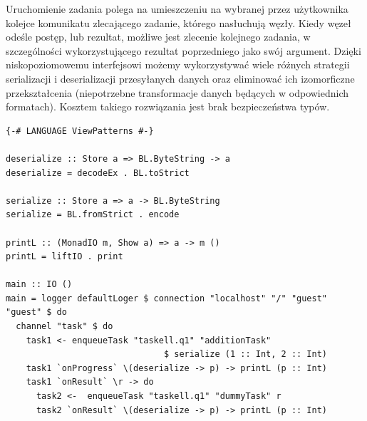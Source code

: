 Uruchomienie zadania polega na umieszczeniu na wybranej przez użytkownika kolejce komunikatu zlecającego zadanie, którego nasłuchują węzły. Kiedy węzeł odeśle postęp, lub rezultat, możliwe jest zlecenie kolejnego zadania, w szczególności wykorzystującego rezultat poprzedniego jako swój argument. Dzięki niskopoziomowemu interfejsowi możemy wykorzystywać wiele różnych strategii serializacji i deserializacji przesyłanych danych oraz eliminować ich izomorficzne przekształcenia (niepotrzebne transformacje danych będących w odpowiednich formatach). Kosztem takiego rozwiązania jest brak bezpieczeństwa typów.
\newpage
\begin{lstlisting}
{-# LANGUAGE ViewPatterns #-}

deserialize :: Store a => BL.ByteString -> a
deserialize = decodeEx . BL.toStrict

serialize :: Store a => a -> BL.ByteString
serialize = BL.fromStrict . encode

printL :: (MonadIO m, Show a) => a -> m ()
printL = liftIO . print

main :: IO ()
main = logger defaultLoger $ connection "localhost" "/" "guest" "guest" $ do
  channel "task" $ do
    task1 <- enqueueTask "taskell.q1" "additionTask" 
                               $ serialize (1 :: Int, 2 :: Int)
    task1 `onProgress` \(deserialize -> p) -> printL (p :: Int)
    task1 `onResult` \r -> do
      task2 <-  enqueueTask "taskell.q1" "dummyTask" r
      task2 `onResult` \(deserialize -> p) -> printL (p :: Int)
\end{lstlisting}